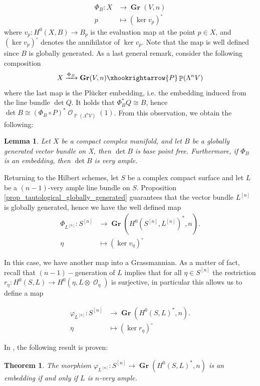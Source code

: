 \documentclass{article}
\DeclareMathOperator{\bP}{\mathbb{P}}
\DeclareMathOperator{\cO}{\mathcal{O}}
\DeclareMathOperator{\gr}{\mathbf{Gr}}
\newcommand{\hilb}[2][n]{#2^{[#1]}}
\newtheorem{lemma}[proposition]{Lemma}
\newtheorem{theorem}[proposition]{Theorem}
\begin{document}
\begin{align*}
    \Phi_B: X&\to \gr(V,n)\\
    p&\mapsto (\ker v_p)^\circ
\end{align*}
where $v_p:H^0(X,B)\to B_p$ is the evaluation map at the point $p\in X$, and $(\ker v_p)^\circ$ denotes the annihilator of $\ker v_p$. Note that the map is well defined since $B$ is globally generated. As a last general remark, consider the following composition 
$$X\xrightarrow{\Phi_B}\gr(V,n)\xhookrightarrow{P} \bP(\Lambda^n V)$$ where the last map is the Pl\"ucker embedding, i.e. the embedding induced from the line bundle $\det Q$. It holds that $\Phi_B^*Q\cong B$, hence $\det B\cong(\Phi_B\circ P)^*\cO_{\bP(\Lambda^nV)}(1)$. 
From this observation, we obtain the following:

\begin{lemma}\label{lemma_vector_bundle_to_determinat_line_bundle}
Let $X$ be a compact complex manifold, and let $B$ be a globally generated vector bundle on X, then $\det B$ is base point free. Furthermore, if $\Phi_B$ is an embedding, then $\det B$ is very ample.
\end{lemma}

Returning to the Hilbert schemes, let $S$ be a complex compact surface and let $L$ be a $(n-1)$-very ample line bundle on $S$. Proposition \ref{prop_tautological_globally_generated} guarantees that the vector bundle $\hilb{L}$ is globally generated, hence we have the well defined map 
\begin{align*}
    \Phi_{\hilb{L}}:\hilb{S}&\to \gr(H^0(\hilb{S},\hilb{L})^*,n).\\
    \eta &\mapsto (\ker v_\eta)^\circ
\end{align*}


In this case, we have another map into a Grassmannian. As a matter of fact, recall that $(n-1)-$generation of $L$ implies that for all $\eta\in \hilb{S}$ the restriction $r_\eta :H^0(S,L)\to H^0(\eta,L\otimes\cO_\eta)$ is surjective, in particular this allows us to define a map 

\begin{align*}
    \varphi_{\hilb{L}}:\hilb{S}&\to \gr(H^0(S,L)^*,n).\\
    \eta &\mapsto (\ker r_\eta)^\circ 
\end{align*}

In \cite{Catanese_Goettsche}, the following result is proven:

\begin{theorem}
The morphism $\varphi_{\hilb{L}}:\hilb{S}\to \gr(H^0(S,L)^*,n)$ is an embedding if and only if $L$ is $n$-very ample.
\end{theorem}
\end{document}
